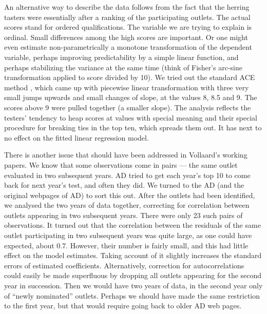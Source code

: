 \documentclass[alpha-refs]{wiley-article}
\newcommand{\rg}[1]{\textcolor{red}{#1}}
\begin{document}
An alternative way to describe the data follows from the fact that the herring tasters were essentially after a ranking of the participating outlets. The actual scores stand for ordered qualifications. The variable we are trying to explain is ordinal. Small differences among the high scores are important. Or one might even estimate non-parametrically a monotone transformation of the dependent variable, perhaps improving predictability by a simple linear function, and perhaps stabilizing the variance at the same time (think of Fisher's arc-sine transformation applied to score divided by 10). We tried out the standard ACE method \citep*{breiman1985estimating},
which came up with piecewise linear transformation with three very small jumps upwards and small changes of slope, at the values 8, 8.5 and 9. The scores above 9 were pulled together (a smaller slope). The analysis reflects the testers' tendency to heap scores at values with special meaning and their special procedure for breaking ties in the top ten, which spreads them out. It has next to no effect on the fitted linear regression model.

There is another issue that should have been addressed in Vollaard's working papers. We know that some observations come in pairs --- the same outlet evaluated in two subsequent years. AD tried to get each year's top 10 to come back for next year's test, and often they did.  We turned to the AD (and the original webpages of AD) to sort this out. After the outlets had been identified, we analysed the two years of data together, correcting for correlation between outlets appearing in two subsequent years. There were only 23 such pairs of observations. It turned out that the correlation between the residuals of the same outlet participating in two subsequent years was quite large, as one could have expected, about $0.7$. However, their number is fairly small, and this had little effect on the model estimates. Taking account of it slightly increases the standard errors of estimated coefficients.  Alternatively, correction for autocorrelations could easily be made superfluous by dropping all outlets appearing for the second year in succession. Then we would have two years of data, in the second year only of ``newly nominated'' outlets. Perhaps we should have made the same restriction to the first year, but that would require going back to older AD web pages.
\end{document}

